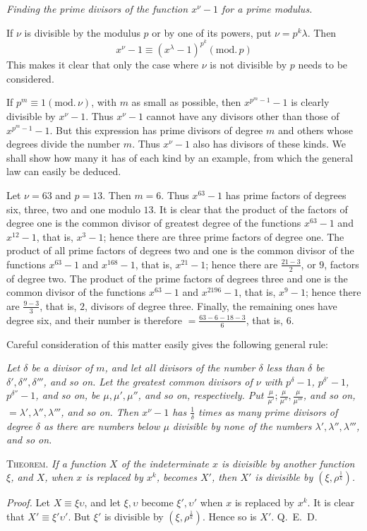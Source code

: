 \par\medskip{}
\begin{center}\emph{Finding the prime divisors of the function $x^\nu-1$ for a prime modulus.}\end{center}
If $\nu$ is divisible by the modulus $p$ or by one of its powers, put $\nu=p^k\lambda$. Then
\[
x^\nu-1\equiv(x^\lambda-1)^{p^k}(\mathrm{mod.}\,p)
\]
This makes it clear that only the case where $\nu$ is not divisible by $p$ needs to be considered.

If $p^m\equiv1(\mathrm{mod.}\,\nu)$, with $m$ as small as possible, then $x^{p^m-1}-1$ is clearly divisible by $x^\nu-1$. Thus $x^\nu-1$ cannot have any divisors other than those of $x^{p^m-1}-1$. But this expression has prime divisors of degree $m$ and others whose degrees divide the number $m$. Thus $x^\nu-1$ also has divisors of these kinds. We shall show how many it has of each kind by an example, from which the general law can easily be deduced.

Let $\nu=63$ and $p=13$. Then $m=6$. Thus $x^{63}-1$ has prime factors of degrees six, three, two and one modulo $13$. It is clear that the product of the factors of degree one is the common divisor of greatest degree of the functions $x^{63}-1$ and $x^{12}-1$, that is, $x^3-1$; hence there are three prime factors of degree one. The product of all prime factors of degrees two and one is the common divisor of the functions $x^{63}-1$ and $x^{168}-1$, that is, $x^{21}-1$; hence there are $\frac{21-3}2$, or $9$, factors of degree two. The product of the prime factors of degrees three and one is the common divisor of the functions $x^{63}-1$ and $x^{2196}-1$, that is, $x^9-1$; hence there are $\frac{9-3}3$, that is, $2$, divisors of degree three. Finally, the remaining ones have degree six, and their number is therefore $=\frac{63-6-18-3}6$, that is, $6$.

Careful consideration of this matter easily gives the following general rule:

\emph{Let $\delta$ be a divisor of $m$, and let all divisors of the number $\delta$ less than $\delta$ be $\delta',\delta'',\delta'''$, and so on. Let the greatest common divisors of $\nu$ with $p^\delta-1$, $p^{\delta'}-1$, $p^{\delta''}-1$, and so on, be $\mu,\mu',\mu''$, and so on, respectively. Put $\frac\mu{\mu'};\frac\mu{\mu''},\frac\mu{\mu'''}$, and so on, $=\lambda',\lambda'',\lambda'''$, and so on. Then $x^\nu-1$ has $\frac1\delta$ times as many prime divisors of degree $\delta$ as there are numbers below $\mu$ divisible by none of the numbers $\lambda',\lambda'',\lambda'''$, and so on.}

\textsc{Theorem.} \emph{If a function $X$ of the indeterminate $x$ is divisible by another function $\xi$, and $X$, when $x$ is replaced by $x^k$, becomes $X'$, then $X'$ is divisible by $(\xi,\rho^{\frac1k})$.}

\emph{Proof.} Let $X\equiv\xi\upsilon$, and let $\xi,\upsilon$ become $\xi',\upsilon'$ when $x$ is replaced by $x^k$. It is clear that $X'\equiv\xi'\upsilon'$. But $\xi'$ is divisible by $(\xi,\rho^{\frac1k})$. Hence so is $X'$. \mbox{Q. E. D.}
